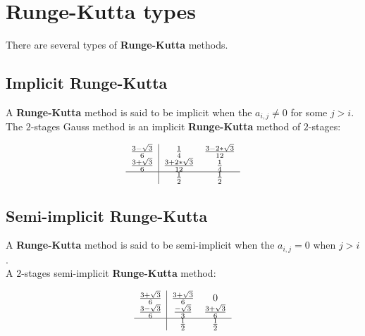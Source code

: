 
\section{Runge-Kutta types}

There are several types of \textbf{Runge-Kutta} methods.

\subsection{Implicit Runge-Kutta}

A \textbf{Runge-Kutta} method is said to be implicit when the $a_{i,j} \neq 0$ for some $j > i$.\\

The $2$-stages Gauss method is an implicit \textbf{Runge-Kutta} method of $2$-stages:
%
\begin{center}
\begin{displaymath}
\begin{array}{c|cc}
\frac{3-\sqrt 3}{6} & \frac{1}{4} & \frac{3-2*\sqrt 3}{12} \\
\frac{3+\sqrt 3}{6} & \frac{3+2*\sqrt 3}{12} &\frac{1}{4} \\
\hline
 & \frac{1}{2} & \frac{1}{2}
\end{array}
\end{displaymath}
\end{center}

\subsection{Semi-implicit Runge-Kutta}

A \textbf{Runge-Kutta} method is said to be semi-implicit when the $a_{i,j} = 0$ when $j > i$.\\

A $2$-stages semi-implicit \textbf{Runge-Kutta} method:
%
\begin{center}
\begin{displaymath}
\begin{array}{c|cc}
\frac{3+\sqrt 3}{6} & \frac{3+\sqrt 3}{6} & 0 \\
\frac{3-\sqrt 3}{6} & \frac{-\sqrt 3}{3} & \frac {3+\sqrt 3}{6} \\
\hline
 & \frac{1}{2} & \frac{1}{2}
\end{array}
\end{displaymath}
\end{center}

